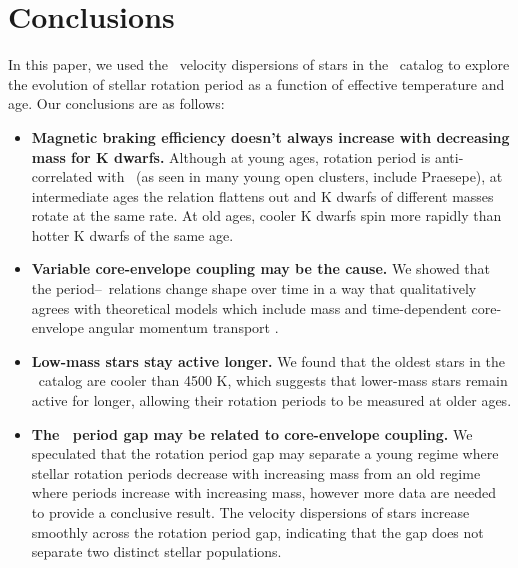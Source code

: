 \section{Conclusions}

In this paper, we used the \vb\ velocity dispersions of stars in the \mct\
catalog to explore the evolution of stellar rotation period as a function of
effective temperature and age.
Our conclusions are as follows:
\begin{itemize}
\item{{\bf Magnetic braking efficiency doesn't always increase with decreasing
mass for K dwarfs.}
Although at young ages, rotation period is anti-correlated with \teff\ (as
seen in many young open clusters, include Praesepe), at intermediate ages the
relation flattens out and K dwarfs of different masses rotate at the same
rate.
At old ages, cooler K dwarfs spin more rapidly than hotter K dwarfs of the
same age.}

\item{{\bf Variable core-envelope coupling may be the cause.} We showed that
the period--\teff\ relations change shape over time in a way that
qualitatively agrees with theoretical models which include mass and
time-dependent core-envelope angular momentum transport \citep{spada2019}.}

\item{{\bf Low-mass stars stay active longer.}
We found that the oldest stars in the \mct\ catalog are cooler than 4500
K, which suggests that lower-mass stars remain active for longer, allowing
their rotation periods to be measured at older ages.}

\item{{\bf The \kepler\ period gap may be related to core-envelope coupling.}
We speculated that the rotation period gap \citep{mcquillan2014} may separate
a young regime where stellar rotation periods decrease with increasing mass
from an old regime where periods increase with increasing mass, however more
data are needed to provide a conclusive result.
The velocity dispersions of stars increase smoothly across the rotation period
gap, indicating that the gap does not separate two distinct stellar
populations.}


\end{itemize}
